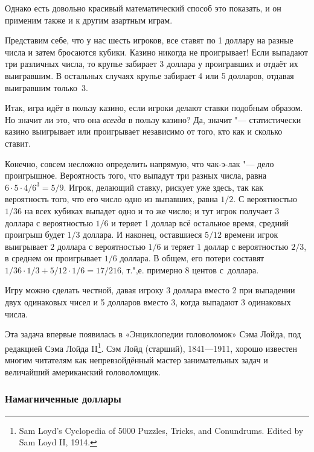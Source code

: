\documentclass[twoside]{book}
\begin{document}
Однако есть довольно красивый математический способ это показать, и он применим также и к другим азартным играм.


Представим себе, что у нас шесть игроков, все ставят по 1 доллару на разные числа и затем бросаются кубики.
Казино никогда не проигрывает!
Если выпадают три различных числа, то крупье забирает 3 доллара у проигравших и отдаёт их выигравшим.
В остальных случаях крупье забирает 4 или 5 долларов, отдавая выигравшим только~3.
\heart

Итак, игра идёт в пользу казино, если игроки делают ставки подобным образом.
Но значит ли это, что она \emph{всегда} в пользу казино?
Да, значит "--- статистически казино выигрывает или проигрывает независимо от того, кто как и сколько ставит.

Конечно, совсем несложно определить напрямую, что чак-э-лак "--- дело проигрышное.
Вероятность того, что выпадут три разных числа, равна $6\cdot 5\cdot 4/6^3=5/9$.
Игрок, делающий ставку, рискует уже здесь, так как вероятность того, что его число одно из выпавших, равна $1/2$.
С вероятностью $1/36$ на всех кубиках выпадет одно и то же число;
и тут игрок получает $3$ доллара с вероятностью $1/6$ и теряет 1 доллар всё остальное время, средний проигрыш будет $1/3$ доллара.
И наконец, оставшиеся $5/12$ времени игрок выигрывает $2$ доллара с вероятностью $1/6$ и теряет $1$ доллар с вероятностью $2/3$, в среднем он проигрывает $1/6$ доллара.
В общем, его потери составят $1/36 \cdot 1/3 + 5/12 \cdot 1/6 = 17/216$, т.",е. примерно $8$ центов с~доллара.

\medskip

Игру можно сделать честной, давая игроку 3 доллара вместо 2 при выпадении двух одинаковых чисел 
и 5 долларов вместо 3, когда выпадают 3 одинаковых числа.

\medskip

Эта задача впервые появилась в «Энциклопедии головоломок» Сэма Лойда, под редакцией Сэма Лойда II\footnote{{Sam Loyd’s Cyclopedia of 5000 Puzzles, Tricks, and Conundrums.} Edited by Sam Loyd II, 1914.}.
Сэм Лойд (старший), 1841---1911, хорошо известен многим читателям как непревзойдённый мастер занимательных задач и величайший американский головоломщик.

\subsubsection*{Намагниченные доллары}%
\end{document}

